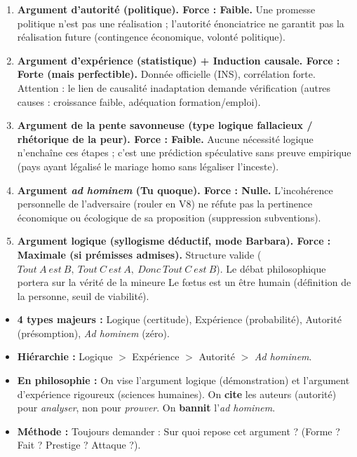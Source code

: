 \documentclass[11pt]{article}
\begin{document}
\begin{corrige}
\begin{enumerate}
    \item \textbf{Argument d'autorité (politique). Force : Faible.} Une promesse politique n'est pas une réalisation ; l'autorité énonciatrice ne garantit pas la réalisation future (contingence économique, volonté politique).
    \item \textbf{Argument d'expérience (statistique) + Induction causale. Force : Forte (mais perfectible).} Donnée officielle (INS), corrélation forte. Attention : le lien de causalité \guillemotleft inadaptation \guillemotright demande vérification (autres causes : croissance faible, adéquation formation/emploi).
    \item \textbf{Argument de la pente savonneuse (type logique fallacieux / rhétorique de la peur). Force : Faible.} Aucune nécessité logique n'enchaîne ces étapes ; c'est une prédiction spéculative sans preuve empirique (pays ayant légalisé le mariage homo sans légaliser l'inceste).
    \item \textbf{Argument \emph{ad hominem} (Tu quoque). Force : Nulle.} L'incohérence personnelle de l'adversaire (rouler en V8) ne réfute pas la pertinence économique ou écologique de sa proposition (suppression subventions).
    \item \textbf{Argument logique (syllogisme déductif, mode Barbara). Force : Maximale (si prémisses admises).} Structure valide ($Tout\ A\ est\ B,\ Tout\ C\ est\ A,\ Donc\ Tout\ C\ est\ B$). Le débat philosophique portera sur la vérité de la mineure \guillemotleft Le fœtus est un être humain \guillemotright (définition de la personne, seuil de viabilité).
\end{enumerate}
\end{corrige}

\begin{aretenir}
\begin{itemize}
    \item \textbf{4 types majeurs :} Logique (certitude), Expérience (probabilité), Autorité (présomption), \emph{Ad hominem} (zéro).
    \item \textbf{Hiérarchie :} Logique $>$ Expérience $>$ Autorité $>$ \emph{Ad hominem}.
    \item \textbf{En philosophie :} On vise l'argument logique (démonstration) et l'argument d'expérience rigoureux (sciences humaines). On \textbf{cite} les auteurs (autorité) pour \emph{analyser}, non pour \emph{prouver}. On \textbf{bannit} l'\emph{ad hominem}.
    \item \textbf{Méthode :} Toujours demander : \guillemotleft Sur quoi repose cet argument ? \guillemotright (Forme ? Fait ? Prestige ? Attaque ?).
\end{itemize}
\end{aretenir}
\end{document}
